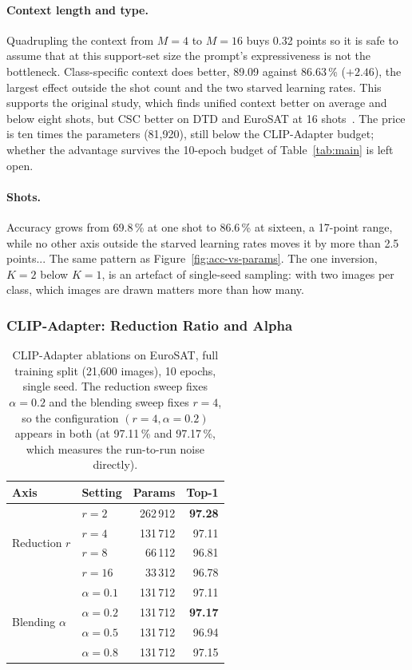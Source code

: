 \documentclass[10pt,twocolumn,letterpaper]{article}
\begin{document}
\paragraph{Context length and type.}
Quadrupling the context from $M{=}4$ to $M{=}16$ buys 0.32 points so it is safe to assume that at this support-set size the prompt's expressiveness is not the bottleneck.
Class-specific context does better, 89.09 against 86.63\,\% ($+2.46$),
the largest effect outside the shot count and the two starved learning
rates.  This supports the original study, which finds unified context
better on average and below eight shots, but CSC better on DTD and EuroSAT
at 16 shots~\cite{zhou2022learning}.  The price is ten times the
parameters (81{,}920), still below the CLIP-Adapter budget; whether the
advantage survives the 10-epoch budget of Table~\ref{tab:main} is left
open.

\paragraph{Shots.}
Accuracy grows from 69.8\,\% at one shot to 86.6\,\% at sixteen, a
17-point range, while no other axis outside the starved learning rates
moves it by more than 2.5 points... The same pattern as
Figure~\ref{fig:acc-vs-params}.  The one inversion, $K{=}2$ below $K{=}1$,
is an artefact of single-seed sampling: with two images per class, which
images are drawn matters more than how many.

\subsubsection{CLIP-Adapter: Reduction Ratio and Alpha}
\label{sec:adapter-ablation}

\begin{table}[t]
\centering
\caption{CLIP-Adapter ablations on EuroSAT, full training split
  (21{,}600 images), 10 epochs, single seed.  The reduction sweep fixes
  $\alpha{=}0.2$ and the blending sweep fixes $r{=}4$, so the
  configuration $(r{=}4, \alpha{=}0.2)$ appears in both (at 97.11\,\%
  and 97.17\,\%, which measures the run-to-run noise directly).}
\label{tab:adapter-ablation}
\footnotesize
\setlength{\tabcolsep}{4pt}
\begin{tabular}{@{}llrr@{}}
\toprule
\textbf{Axis} & \textbf{Setting} & \textbf{Params} & \textbf{Top-1} \\
\midrule
\multirow{4}{*}{Reduction $r$}
  & $r = 2$  & 262\,912 & \textbf{97.28} \\
  & $r = 4$  & 131\,712 & 97.11 \\
  & $r = 8$  &  66\,112 & 96.81 \\
  & $r = 16$ &  33\,312 & 96.78 \\
\midrule
\multirow{4}{*}{Blending $\alpha$}
  & $\alpha = 0.1$ & 131\,712 & 97.11 \\
  & $\alpha = 0.2$ & 131\,712 & \textbf{97.17} \\
  & $\alpha = 0.5$ & 131\,712 & 96.94 \\
  & $\alpha = 0.8$ & 131\,712 & 97.15 \\
\bottomrule
\end{tabular}
\end{table}
\end{document}
